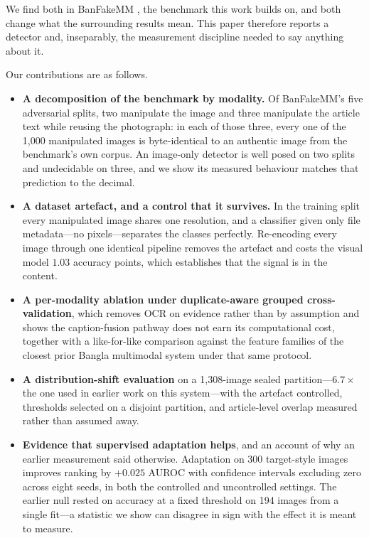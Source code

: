 \documentclass[journal]{IEEEtran}
\begin{document}
We find both in BanFakeMM \cite{banfakemm}, the benchmark this work builds on,
and both change what the surrounding results mean. This paper therefore reports
a detector and, inseparably, the measurement discipline needed to say anything
about it.

Our contributions are as follows.

\begin{itemize}
\item \textbf{A decomposition of the benchmark by modality.} Of BanFakeMM's
five adversarial splits, two manipulate the image and three manipulate the
article text while reusing the photograph: in each of those three, every one
of the 1{,}000 manipulated images is byte-identical to an authentic image from
the benchmark's own corpus. An image-only detector is well posed on two splits
and undecidable on three, and we show its measured behaviour matches that
prediction to the decimal.

\item \textbf{A dataset artefact, and a control that it survives.} In the
training split every manipulated image shares one resolution, and a classifier
given only file metadata---no pixels---separates the classes perfectly.
Re-encoding every image through one identical pipeline removes the artefact and
costs the visual model $1.03$ accuracy points, which establishes that the
signal is in the content.

\item \textbf{A per-modality ablation under duplicate-aware grouped
cross-validation}, which removes OCR on evidence rather than by assumption and
shows the caption-fusion pathway does not earn its computational cost, together
with a like-for-like comparison against the feature families of the closest
prior Bangla multimodal system under that same protocol.

\item \textbf{A distribution-shift evaluation} on a 1{,}308-image sealed
partition---$6.7\times$ the one used in earlier work on this system---with the
artefact controlled, thresholds selected on a disjoint partition, and
article-level overlap measured rather than assumed away.

\item \textbf{Evidence that supervised adaptation helps}, and an account of why
an earlier measurement said otherwise. Adaptation on 300 target-style images
improves ranking by $+0.025$ AUROC with confidence intervals excluding zero
across eight seeds, in both the controlled and uncontrolled settings. The
earlier null rested on accuracy at a fixed threshold on 194 images from a
single fit---a statistic we show can disagree in sign with the effect it is
meant to measure.
\end{itemize}
\end{document}
